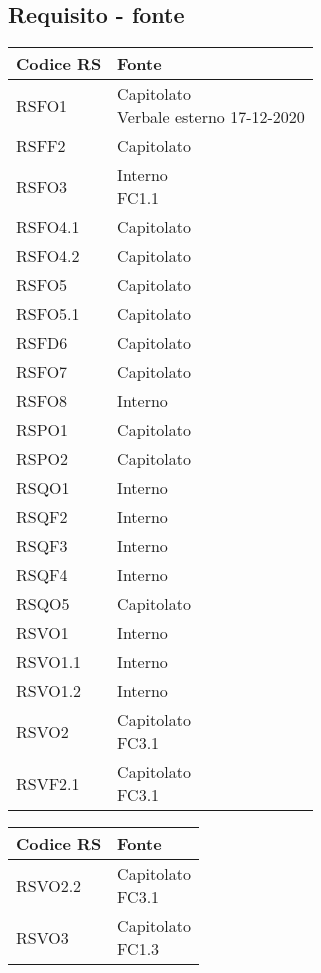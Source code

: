 {\subsection{Requisito - fonte}
\begin{center}
	\renewcommand{\arraystretch}{1.4}
	\begin{tabularx}{\textwidth}{ |X|X| }
		\hline
		\rowcolor{Melon}
		\textbf{Codice RS} & \textbf{Fonte}  \\
		\hline
RSFO1 & \makecell[tcX]{Capitolato\\Verbale esterno 17-12-2020} \\
\hline
RSFF2 & Capitolato\\
\hline
RSFO3 & \makecell[tcX]{Interno\\FC1.1}\\
\hline
RSFO4.1 & Capitolato\\
\hline
RSFO4.2 & Capitolato\\
\hline
RSFO5 & Capitolato\\
\hline
RSFO5.1 & Capitolato\\
\hline
RSFD6 & Capitolato\\
\hline
RSFO7 & Capitolato\\
\hline
RSFO8 & Interno\\
\hline
RSPO1 & Capitolato\\
\hline
RSPO2 & Capitolato\\
\hline
RSQO1 & Interno\\
\hline
RSQF2 & Interno\\
\hline
RSQF3 & Interno\\
\hline
RSQF4 & Interno\\
\hline
RSQO5 & Capitolato\\
\hline
RSVO1 & Interno\\
\hline
RSVO1.1 & Interno\\
\hline
RSVO1.2 & Interno\\
\hline
RSVO2 & \makecell[tcX]{Capitolato\\FC3.1}\\
\hline
RSVF2.1 & \makecell[tcX]{Capitolato\\FC3.1}\\
\hline
	\end{tabularx}
\end{center}
\begin{center}
	\renewcommand{\arraystretch}{1.4}
	\begin{tabularx}{\textwidth}{ |X|X| }
		\hline
		\rowcolor{Melon}
		\textbf{Codice RS} & \textbf{Fonte}  \\
		\hline
RSVO2.2 & \makecell[tcX]{Capitolato\\FC3.1}\\
\hline
RSVO3 & \makecell[tcX]{Capitolato\\FC1.3}\\
\hline
	\end{tabularx}
\end{center}

}
